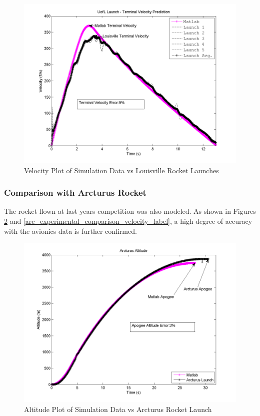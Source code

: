 \documentclass[]{article}
\begin{document}
\begin{figure}[htbp]
\centering
\includegraphics{images/plots/plot_louisville_velocity_analysis.png}
\caption{Velocity Plot of Simulation Data vs Louisville Rocket Launches
\label{experimental_comparison_velocity_label}}
\end{figure}

\clearpage 

\subsubsection{Comparison with Arcturus
Rocket}\label{comparison-with-arcturus-rocket}

The rocket flown at last years competition was also modeled. As shown in
Figures \ref{arc_experimental_comparison_altitude_label} and
\ref{arc_experimental_comparison_velocity_label}, a high degree of
accuracy with the avionics data is further confirmed.

\begin{figure}[htbp]
\centering
\includegraphics{images/plots/plot_arcturus_altitude_analysis.png}
\caption{Altitude Plot of Simulation Data vs Arcturus Rocket Launch
\label{arc_experimental_comparison_altitude_label}}
\end{figure}
\end{document}
